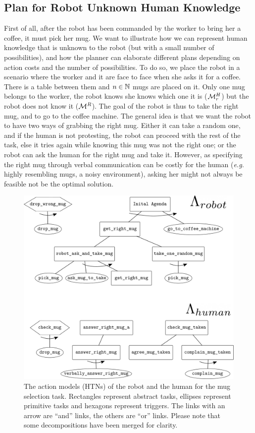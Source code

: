 \documentclass[a4paper,11pt,twoside]{StyleThese}
\begin{document}
\subsection{Plan for Robot Unknown Human Knowledge}
First of all, after the robot has been commanded by the worker to bring her a coffee, it must pick her mug. We want to illustrate how we can represent human knowledge that is unknown to the robot (but with a small number of possibilities), and how the planner can elaborate different plans depending on action costs and the number of possibilities. To do so, we place the robot in a scenario where the worker and it are face to face when she asks it for a coffee. There is a table between them and $n \in \mathbb{N}$ mugs are placed on it. Only one mug belongs to the worker, the robot knows she knows which one it is ($\mathcal{M}^H_r$) but the robot does not know it ($\mathcal{M}^R$). The goal of the robot is thus to take the right mug, and to go to the coffee machine. The general idea is that we want the robot to have two ways of grabbing the right mug. Either it can take a random one, and if the human is not protesting, the robot can proceed with the rest of the task, else it tries again while knowing this mug was not the right one; or the robot can ask the human for the right mug and take it. However, as specifying the right mug through verbal communication can be costly for the human (\textit{e.g.} highly resembling mugs, a noisy environment), asking her might not always be feasible not be the optimal solution.

\begin{figure}[hbtp]
\centering
\includegraphics[width=\textwidth]{figures/chapter4/HTN_hr_mugs.png}
\caption{The action models (HTNs) of the robot and the human for the mug selection task. Rectangles represent abstract tasks, ellipses represent primitive tasks and hexagons represent triggers. The links with an arrow are ``and'' links, the others are ``or'' links. Please note that some decompositions have been merged for clarity.}
\label{fig:chap4rhhtnmug}
\end{figure}
\end{document}
